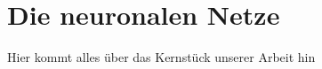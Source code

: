 \section{Die neuronalen Netze}\label{die neuronalen netze}
Hier kommt alles über das Kernstück unserer Arbeit hin